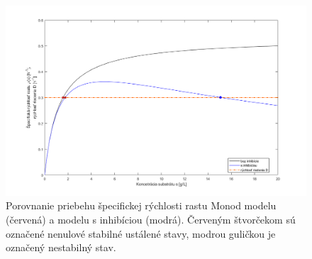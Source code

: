 \begin{figure}
	\centering
	\includegraphics[width=.7\linewidth]{images/spec_grow_rate_comparison}
	\caption[]{Porovnanie priebehu špecifickej rýchlosti rastu Monod modelu (červená) a modelu s inhibíciou (modrá). Červeným štvorčekom sú označené nenulové stabilné ustálené stavy, modrou guličkou je označený nestabilný stav.}
	\label{fig:2}
\end{figure}


